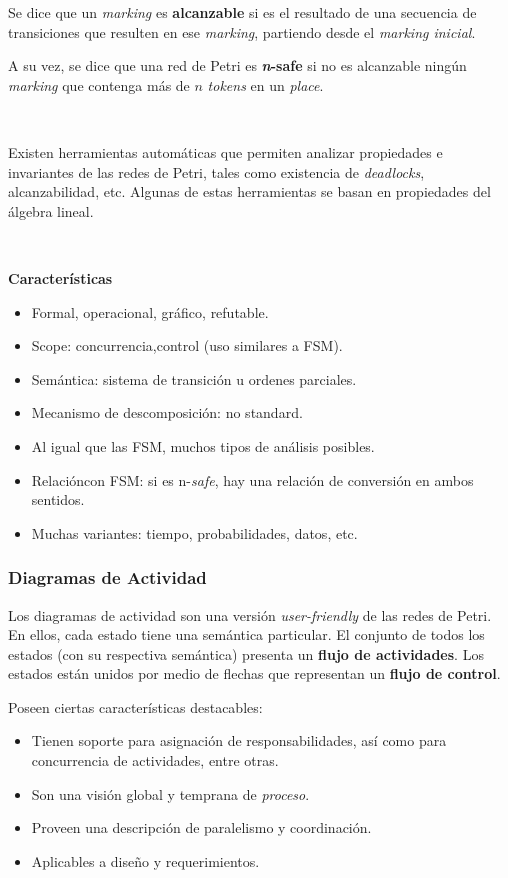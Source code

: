 \documentclass[]{article}
\begin{document}
Se dice que un \textit{marking} es \textbf{alcanzable} si es el resultado de una secuencia de transiciones que resulten en ese \textit{marking}, partiendo desde el \textit{marking inicial}.

A su vez, se dice que una red de Petri es \textbf{\textit{n}-safe} si no es alcanzable ningún \textit{marking} que contenga más de $n$ \textit{tokens} en un \textit{place}.

~\newline

Existen herramientas automáticas que permiten analizar propiedades e invariantes de las redes de Petri, tales como existencia de \textit{deadlocks}, alcanzabilidad, etc. Algunas de estas herramientas se basan en propiedades del álgebra lineal.

~\newline

\textbf{Características}
\begin{itemize}
	\item Formal, operacional, gráfico, refutable.
	\item Scope: concurrencia,control (uso similares a FSM).
	\item Semántica: sistema de transición u ordenes parciales.
	\item Mecanismo de descomposición: no standard.
	\item Al igual que las FSM, muchos tipos de análisis posibles.
	\item Relacióncon FSM: si es n-\textit{safe}, hay una relación de conversión en ambos sentidos.
	\item Muchas variantes: tiempo, probabilidades, datos, etc.
\end{itemize}

\subsubsection{Diagramas de Actividad}
Los diagramas de actividad son una versión \textit{user-friendly} de las redes de Petri. En ellos, cada estado tiene una semántica particular. El conjunto de todos los estados (con su respectiva semántica) presenta un \textbf{flujo de actividades}. Los estados están unidos por medio de flechas que representan un \textbf{flujo de control}.

Poseen ciertas características destacables:
\begin{itemize}
	\item Tienen soporte para asignación de responsabilidades, así como para concurrencia de actividades, entre otras.
	\item Son una visión global y temprana de \textit{proceso}.
	\item Proveen una descripción de paralelismo y coordinación.
	\item Aplicables a diseño y requerimientos.
\end{itemize}
\end{document}

